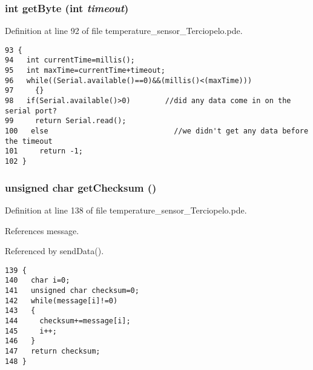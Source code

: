 \hypertarget{temperature__sensor___terciopelo_8pde_f8c68e93feeba5b9244094043672bac0}{
\subsubsection[{getByte}]{\setlength{\rightskip}{0pt plus 5cm}int getByte (int {\em timeout})}}
\label{temperature__sensor___terciopelo_8pde_f8c68e93feeba5b9244094043672bac0}




Definition at line 92 of file temperature\_\-sensor\_\-Terciopelo.pde.

\begin{Code}\begin{verbatim}93 {
94   int currentTime=millis();
95   int maxTime=currentTime+timeout;
96   while((Serial.available()==0)&&(millis()<(maxTime)))
97     {}
98   if(Serial.available()>0)        //did any data come in on the serial port?
99     return Serial.read();
100   else                             //we didn't get any data before the timeout
101     return -1;
102 }
\end{verbatim}
\end{Code}


\hypertarget{temperature__sensor___terciopelo_8pde_465a79dc430d1e52a5b540920da744ca}{
\subsubsection[{getChecksum}]{\setlength{\rightskip}{0pt plus 5cm}unsigned char getChecksum ()}}
\label{temperature__sensor___terciopelo_8pde_465a79dc430d1e52a5b540920da744ca}




Definition at line 138 of file temperature\_\-sensor\_\-Terciopelo.pde.

References message.

Referenced by sendData().

\begin{Code}\begin{verbatim}139 {
140   char i=0;
141   unsigned char checksum=0;
142   while(message[i]!=0)
143   {
144     checksum+=message[i];
145     i++;
146   }
147   return checksum;
148 }
\end{verbatim}
\end{Code}


